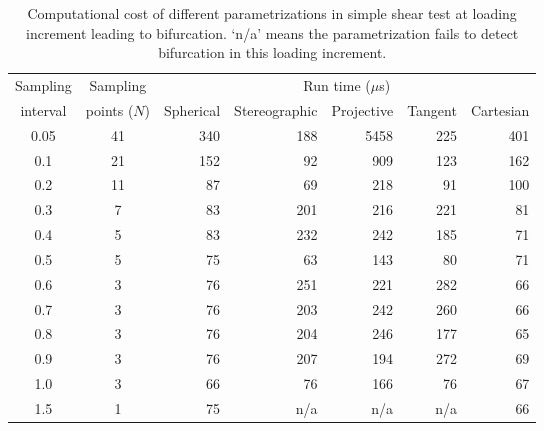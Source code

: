\documentclass[12pt]{article}
\numberwithin{equation}{section}
\begin{document}
\begin{table}[H]
  \begin{center}
    \begin{tabular}{c c | r r r r r}
      \toprule
      Sampling   & Sampling &   \multicolumn{5}{c}{Run time ($\mu$s)}	\\   
      interval     & points ($N$)     &  Spherical    &   Stereographic  &   Projective  &   Tangent   & Cartesian  \\
      \midrule         
      0.05      &      41     &    340        &       188       &       5458      &      225       &       401         \\
      0.1        &      21     &    152        &       92         &       909        &      123       &       162         \\
      0.2        &      11     &    87          &       69         &       218        &      91         &       100         \\
      0.3        &      7       &    83          &       201       &       216        &      221       &       81          \\
      0.4        &      5       &    83          &       232       &       242        &      185       &       71          \\       
      0.5        &	    5       &    75          &       63         &       143        &      80         &       71          \\
      0.6        &	    3       &    76          &       251       &       221        &      282       &       66          \\
      0.7        &	    3       &    76	      &       203       &       242        &      260       &       66          \\
      0.8        &      3       &    76          &       204       &       246        &      177       &       65          \\	      
      0.9        &	    3       &    76          &       207       &       194        &      272       &       69          \\	
      1.0        &      3	     &    66	      &       76         &       166        &      76         &       67          \\	
      1.5        &	    1       &    75	      &       n/a        &       n/a         &      n/a        &       66          \\	       
      \bottomrule
    \end{tabular}
    \caption{Computational cost of different parametrizations in 
    simple shear test at loading increment leading to bifurcation. 
    `n/a' means the parametrization fails to detect bifurcation in 
    this loading increment.}
    \label{tab:iso_shear_runtime}
  \end{center}
\end{table}
\end{document}
